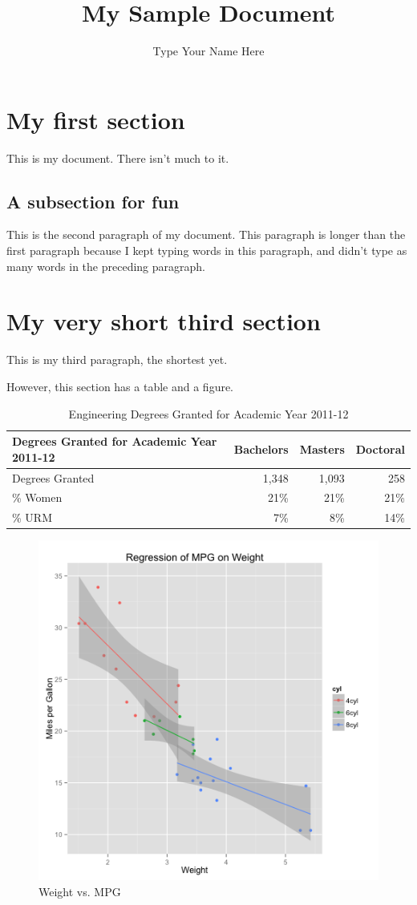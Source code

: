 \documentclass{article}
\title{My Sample Document}
\author{Type Your Name Here}
\begin{document}
\maketitle
\tableofcontents
\listoftables
\listoffigures
\section{My first section}
This is my document.  There isn't much to it.

\subsection{A subsection for fun}
This is the second paragraph of my document.  This
paragraph is longer than the first paragraph because
I kept typing words in this paragraph, and didn't
type as many words in the preceding paragraph.

\section{My very short third section}
This is my third paragraph, the shortest yet.

However, this section has a table and a figure.

 \begin{table}
 \begin{tabular}{l|r|r|r}
 Degrees Granted for Academic Year 2011-12 & Bachelors & Masters & Doctoral \\ \hline
 Degrees Granted                           &    1,348  &  1,093  &    258   \\
 \% Women                                  &      21\% &    21\% &    21\%  \\
 \% URM                                    &       7\% &     8\% &    14\%  \\ \hline
 \end{tabular}
 \caption{Engineering Degrees Granted for Academic Year 2011-12}
 \end{table}

\begin{figure}
\includegraphics[width=.9\linewidth]{mpg-weight.png}
\caption{Weight vs. MPG}
\end{figure}
\end{document}
